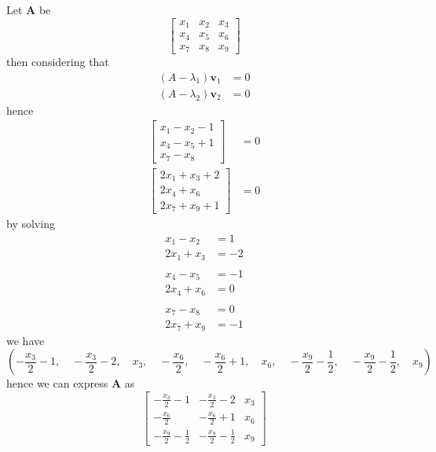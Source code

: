 \documentclass[12pt]{article}
\newcommand{\matr}[1]{\bm{#1}}
\newenvironment{answer}[2][Answer]{\begin{trivlist}
    \item[\hskip \labelsep {\bfseries #1}\hskip \labelsep {\bfseries #2.}]}{\end{trivlist}}
\begin{document}
\begin{answer}{Q. 2}
\end{answer}
Let $\matr A$ be 
\begin{equation}
	\left[\begin{matrix}x_{1} & x_{2} & x_{3}\\x_{4} & x_{5} & x_{6}\\x_{7} & x_{8} & x_{9}\end{matrix}\right]
\end{equation}
then considering that 
\begin{align} 
	(A-\lambda_1)\matr v_1 & =0 \\
	(A-\lambda_2)\matr v_2 & =0 
\end{align}
hence
\begin{align} 
	\left[\begin{matrix}x_{1} - x_{2} - 1   \\x_{4} - x_{5} + 1\\x_{7} - x_{8}\end{matrix}\right] &= 0 \\
	\left[\begin{matrix}2 x_{1} + x_{3} + 2 \\2 x_{4} + x_{6}\\2 x_{7} + x_{9} + 1\end{matrix}\right] &= 0
\end{align}
by solving 
\begin{align}
	x_1-x_2    & =1   \\
	2x_1+x_3   & = -2 \\ \\
	x_4-x_5    & = -1 \\
	2x_4 + x_6 & = 0  \\ \\
	x_7-x_8    & = 0  \\
	2x_7+x_9   & = -1 
\end{align}
we have
\begin{equation}
	\left ( - \frac{x_{3}}{2} - 1, \quad - \frac{x_{3}}{2} - 2, \quad x_{3}, \quad - \frac{x_{6}}{2}, \quad - \frac{x_{6}}{2} + 1, \quad x_{6}, \quad - \frac{x_{9}}{2} - \frac{1}{2}, \quad - \frac{x_{9}}{2} - \frac{1}{2}, \quad x_{9}\right )
\end{equation}
hence we can express $\matr A$ as
\begin{equation}
	\left[\begin{matrix}- \frac{x_{3}}{2} - 1 & - \frac{x_{3}}{2} - 2 & x_{3}\\- \frac{x_{6}}{2} & - \frac{x_{6}}{2} + 1 & x_{6}\\- \frac{x_{9}}{2} - \frac{1}{2} & - \frac{x_{9}}{2} - \frac{1}{2} & x_{9}\end{matrix}\right]
\end{equation}
\end{document}
